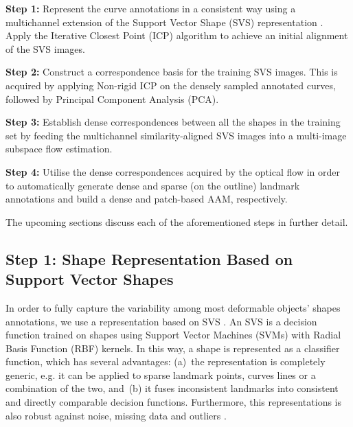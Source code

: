 \noindent\textbf{Step 1:} Represent the curve annotations in a consistent way using a multichannel extension of the Support Vector Shape (SVS) representation \cite{Nguyen2013}. Apply the Iterative Closest Point (ICP) algorithm \cite{Besl1992} to achieve an initial alignment of the SVS images.

\noindent\textbf{Step 2:} Construct a correspondence basis for the training SVS images. This is acquired by applying Non-rigid ICP on the densely sampled annotated curves, followed by Principal Component Analysis (PCA).

\noindent\textbf{Step 3:} Establish dense correspondences between all the shapes in the training set by feeding the multichannel similarity-aligned SVS images into a multi-image subspace flow estimation.

\noindent\textbf{Step 4:} Utilise the dense correspondences acquired by the optical flow in order to automatically generate dense and sparse (on the outline) landmark annotations and build a dense \cite{ramnath2008increasing, Amberg2009, anderson2014using} and patch-based \cite{Tzimiropoulos2014} AAM, respectively.

The upcoming sections discuss each of the aforementioned steps in further detail.

{\label{sec:step1}\subsection*{Step 1: Shape Representation Based on Support Vector Shapes}}

In order to fully capture the variability among most deformable objects' shapes annotations, we use a representation based on SVS \cite{Nguyen2013}. An SVS is a decision function trained on shapes using Support Vector Machines (SVMs) with Radial Basis Function (RBF) kernels. In this way, a shape is represented as a classifier function, which has several advantages: (a)~the representation is completely generic, e.g. it can be applied to sparse landmark points, curves lines or a combination of the two, and~(b) it fuses inconsistent landmarks into consistent and directly comparable decision functions. Furthermore, this representations is also robust against noise, missing data and outliers \cite{Nguyen2013}.

